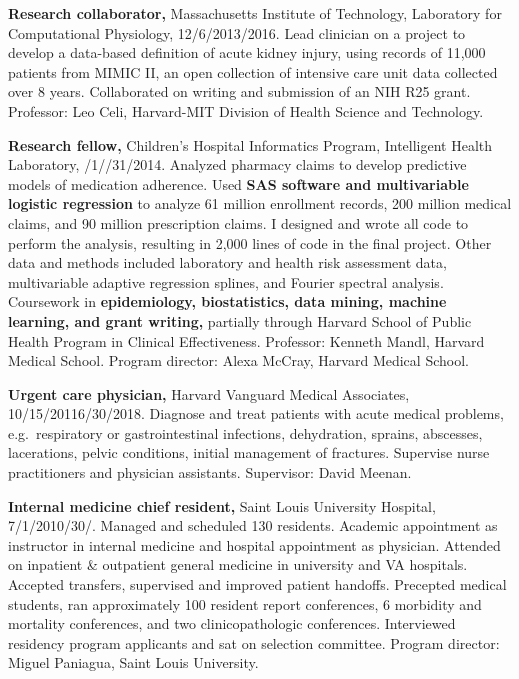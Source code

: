 \documentclass[10pt]{article}
\begin{document}
\textbf{Research collaborator,} Massachusetts Institute of Technology,
Laboratory for Computational Physiology,
12/6/2013\ndash{}/2016. Lead clinician on a project to
develop a data-based definition of acute kidney injury, using records
of 11,000 patients from MIMIC II, an open collection of intensive care
unit data collected over 8 years. Collaborated on writing and
submission of an NIH R25 grant. Professor: Leo Celi, Harvard-MIT
Division of Health Science and Technology.

\textbf{Research fellow,} Children's Hospital Informatics Program,
Intelligent Health Lab\-o\-ra\-to\-ry,
/1/\ndash{}/31/2014.
Analyzed pharmacy claims to develop predictive models of medication
adherence. Used \textbf{SAS software and multivariable logistic
  regression} to analyze 61 million enrollment records, 200 million
medical claims, and 90 million prescription claims. I designed and
wrote all code to perform the analysis, resulting in 2,000 lines of
code in the final project. Other data and methods included laboratory
and health risk assessment data, multivariable adaptive regression
splines, and Fourier spectral analysis. Coursework in
\textbf{epidemiology, biostatistics, data mining, machine learning,
  and grant writing,} partially through Harvard School of Public
Health Program in Clinical Effectiveness. Professor: Kenneth Mandl,
Harvard Medical School. Program director: Alexa McCray, Harvard
Medical School.

\textbf{Urgent care physician,} Harvard Vanguard Medical Associates,
10/15/2011\ndash{}6/30/2018. Diagnose and treat patients with acute
medical problems, e.g.\ respiratory or gastrointestinal infections,
dehydration, sprains, abscesses, lacerations, pelvic conditions,
initial management of fractures. Supervise nurse practitioners and
physician assistants. Supervisor: David Meenan.

\textbf{Internal medicine chief resident,} Saint Louis University
Hospital, 7/1/2010\ndash{}/30/. Managed
and scheduled 130 residents. Academic appointment as instructor in
internal medicine and hospital appointment as physician. Attended on
inpatient \& outpatient general medicine in university and VA
hospitals. Accepted transfers, supervised and improved patient
handoffs. Precepted medical students, ran approximately 100 resident
report conferences, 6 morbidity and mortality conferences, and two
clinicopathologic conferences. Interviewed residency program
applicants and sat on selection committee. Program director: Miguel
Paniagua, Saint Louis University.
\end{document}
